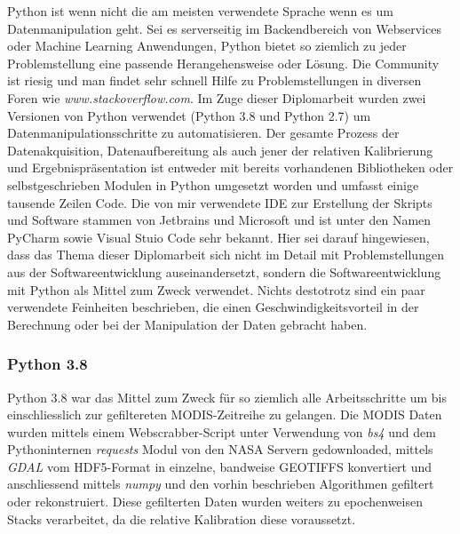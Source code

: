 \documentclass[11pt]{report}
\begin{document}
Python ist wenn nicht die am meisten verwendete Sprache wenn es um Datenmanipulation geht. Sei es serverseitig im Backendbereich von Webservices oder Machine Learning Anwendungen, Python bietet so ziemlich zu jeder Problemstellung eine passende Herangehensweise oder Lösung. Die Community ist riesig und man findet sehr schnell Hilfe zu Problemstellungen in diversen Foren wie \emph{www.stackoverflow.com}. Im Zuge dieser Diplomarbeit wurden zwei Versionen von Python verwendet (Python 3.8 und Python 2.7) um Datenmanipulationsschritte zu automatisieren. Der gesamte Prozess der Datenakquisition, Datenaufbereitung als auch jener der relativen Kalibrierung und Ergebnispräsentation ist entweder mit bereits vorhandenen Bibliotheken oder selbstgeschrieben Modulen in Python umgesetzt worden und umfasst einige tausende Zeilen Code. Die von mir verwendete IDE zur Erstellung der Skripts und Software stammen von Jetbrains und Microsoft und ist unter den Namen PyCharm sowie Visual Stuio Code sehr bekannt. Hier sei darauf hingewiesen, dass das Thema dieser Diplomarbeit sich nicht im Detail mit Problemstellungen aus der Softwareentwicklung auseinandersetzt, sondern die Softwareentwicklung mit Python als Mittel zum Zweck verwendet. Nichts destotrotz sind ein paar verwendete Feinheiten beschrieben, die einen Geschwindigkeitsvorteil in der Berechnung oder bei der Manipulation der Daten gebracht haben. 
\subsubsection{Python 3.8}
Python 3.8 war das Mittel zum Zweck für so ziemlich alle Arbeitsschritte um bis einschliesslich zur gefiltereten MODIS-Zeitreihe zu gelangen. Die MODIS Daten wurden mittels einem Webscrabber-Script unter Verwendung von \emph{bs4} und dem Pythoninternen \emph{requests} Modul von den NASA Servern gedownloaded, mittels \emph{GDAL} vom HDF5-Format in einzelne, bandweise GEOTIFFS konvertiert und anschliessend mittels \emph{numpy} und den vorhin beschrieben Algorithmen gefiltert oder rekonstruiert. Diese gefilterten Daten wurden weiters zu epochenweisen Stacks verarbeitet, da die relative Kalibration diese voraussetzt.
\end{document}
